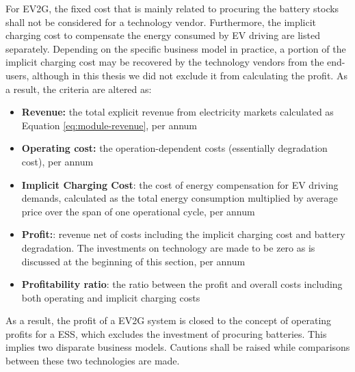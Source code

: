 For EV2G, the fixed cost that is mainly related to procuring the battery stocks shall not be considered for a technology vendor. Furthermore, the implicit charging cost to compensate the energy consumed by EV driving are listed separately. Depending on the specific business model in practice, a portion of the implicit charging cost may be recovered by the technology vendors from the end-users, although in this thesis we did not exclude it from calculating the profit. As a result, the criteria are altered as:
\begin{itemize}
	\item \textbf{Revenue:} the total explicit revenue from electricity markets calculated as Equation \eqref{eq:module-revenue}, per annum
	\item \textbf{Operating cost:} the operation-dependent costs (essentially degradation cost), per annum
	\item \textbf{Implicit Charging Cost}: the cost of energy compensation for EV driving demands, calculated as the total energy consumption multiplied by average price over the span of one operational cycle, per annum
	\item \textbf{Profit:}: revenue net of costs including the implicit charging cost and battery degradation. The investments on technology are made to be zero as is discussed at the beginning of this section, per annum
	\item  \textbf{Profitability ratio}: the ratio between the profit and overall costs including both operating and implicit charging costs
\end{itemize}

As a result, the profit of a EV2G system is closed to the concept of operating profits for a ESS, which excludes the investment of procuring batteries. This implies two disparate business models. Cautions shall be raised while comparisons between these two technologies are made.

